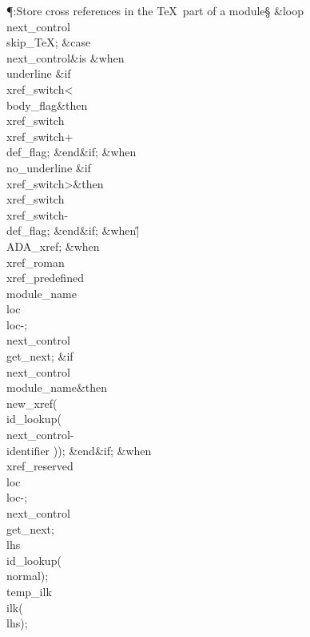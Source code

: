 \Y\P\?\4:Store cross references in the \TeX\ part of a module\X\S\?\6
\1\&{loop}\6
\\{next\_control}\?\K\?\\{skip\_TeX};\6
\&{case}\1\8\\{next\_control}\1\8\&{is}\8\6
\4\&{when}\8\\{underline}\KR\6
\&{if}\1\1\8\\{xref\_switch}\?<\?\\{body\_flag}\2\8\&{then}\6
\\{xref\_switch}\?\K\?\\{xref\_switch}\?+\?\\{def\_flag};\2\6
\&{end}\8\2\&{if}\1;\6
\4\&{when}\8\\{no\_underline}\KR\6
\&{if}\1\1\8\\{xref\_switch}\?>\2\8\&{then}\6
\\{xref\_switch}\?\K\?\\{xref\_switch}\?-\?\\{def\_flag};\2\6
\&{end}\8\2\&{if}\1;\6
\4\&{when}\8\H{|}\KR\6
\\{ADA\_xref};\6
\4\&{when}\8\\{xref\_roman}\?\to\?\\{xref\_predefined}\?\mathrel{\.|}\?%
\\{module\_name}\KR\6
\\{loc}\?\K\?\\{loc}\?-;\5
\\{next\_control}\?\K\?\\{get\_next};\6
\&{if}\1\1\8\\{next\_control}\?\I\?\\{module\_name}\2\8\&{then}\6
\\{new\_xref}\?\1(\?\\{id\_lookup}\?\1(\?\\{next\_control}\?-\?\\{identifier}\?%
\2)\2)\?;\2\6
\&{end}\8\2\&{if}\1;\6
\4\&{when}\8\\{xref\_reserved}\KR\6
\\{loc}\?\K\?\\{loc}\?-;\5
\\{next\_control}\?\K\?\\{get\_next};\6
\\{lhs}\?\K\?\\{id\_lookup}\?\1(\?\\{normal}\?\2)\?;\5
\\{temp\_ilk}\?\K\?\\{ilk}\?\1(\?\\{lhs}\?\2)\?;\6
